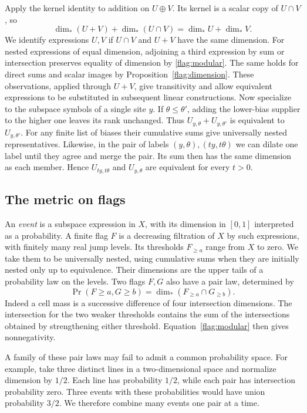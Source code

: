 Apply the kernel identity to addition on $U\oplus V$. Its kernel is a
scalar copy of $U\cap V$, so
\begin{equation}\label{flag:modular}
 \dim_* (U+V)+\dim_*(U\cap V)=\dim_*U+\dim_*V .
\end{equation}
We identify expressions $U,V$ if $U\cap V$ and $U+V$ have the same
dimension. For nested expressions of equal dimension, adjoining a
third expression by sum or intersection preserves equality of
dimension by \eqref{flag:modular}. The same holds for direct sums and
scalar images by Proposition~\ref{flag:dimension}. These observations,
applied through $U+V$, give transitivity and allow equivalent expressions
to be substituted in subsequent linear constructions.
Now specialize to the subspace symbols of a single site $y$. If
$\theta\le\theta'$, adding the lower-bias supplier to the higher one
leaves its rank unchanged. Thus $U_{y,\theta}+U_{y,\theta'}$ is
equivalent to $U_{y,\theta'}$. For any finite list of biases their
cumulative sums give universally nested representatives. Likewise,
in the pair of labels $(y,\theta),(ty,t\theta)$ we can dilate one
label until they agree and merge the pair. Its sum then has the same
dimension as each member. Hence $U_{ty,t\theta}$ and $U_{y,\theta}$
are equivalent for every $t>0$.

\subsection{The metric on flags}

An \emph{event} is a subspace expression in $X$, with its dimension
in $[0,1]$ interpreted as a probability. A finite flag $F$ is a
decreasing filtration of $X$ by such expressions, with finitely many
real jump levels. Its thresholds $F_{\ge a}$ range from $X$ to zero.
We take them to be universally nested, using cumulative sums when they
are initially nested only up to equivalence. Their dimensions are the
upper tails of a probability law on the levels. Two flags $F,G$ also
have a pair law, determined by
\begin{equation}\label{flag:pair}
 \Pr(F\ge a,G\ge b)=\dim_*(F_{\ge a}\cap G_{\ge b}).
\end{equation}
Indeed a cell mass is a successive difference of four intersection
dimensions. The intersection for the two weaker thresholds contains the
sum of the intersections obtained by strengthening either threshold.
Equation~\eqref{flag:modular} then gives nonnegativity.

A family of these pair laws may fail to admit a common probability
space. For example, take three distinct lines in a two-dimensional
space and normalize dimension by $1/2$. Each line has probability
$1/2$, while each pair has intersection probability zero. Three events
with these probabilities would have union probability $3/2$. We
therefore combine many events one pair at a time.

